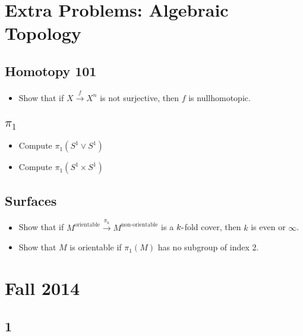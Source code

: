 \hypertarget{extra-problems-algebraic-topology}{%
\section{Extra Problems: Algebraic
Topology}\label{extra-problems-algebraic-topology}}

\hypertarget{homotopy-101}{%
\subsection{Homotopy 101}\label{homotopy-101}}

\begin{itemize}
\tightlist
\item
  Show that if \(X\xrightarrow{f} X^n\) is not surjective, then \(f\) is
  nullhomotopic.
\end{itemize}

\hypertarget{pi_1}{%
\subsection{\texorpdfstring{\(\pi_1\)}{\textbackslash pi\_1}}\label{pi_1}}

\begin{itemize}
\tightlist
\item
  Compute \(\pi_1(S^1 \vee S^1)\)
\item
  Compute \(\pi_1(S^1 \times S^1)\)
\end{itemize}

\hypertarget{surfaces}{%
\subsection{Surfaces}\label{surfaces}}

\begin{itemize}
\tightlist
\item
  Show that if
  \(M^\text{orientable} \xrightarrow{\pi_k} M^\text{non-orientable}\) is
  a \(k{\hbox{-}}\)fold cover, then \(k\) is even or \(\infty\).
\item
  Show that \(M\) is orientable if \(\pi_1(M)\) has no subgroup of index
  2.
\end{itemize}

\hypertarget{fall-2014}{%
\section{Fall 2014}\label{fall-2014}}

\hypertarget{section}{%
\subsection{1}\label{section}}

